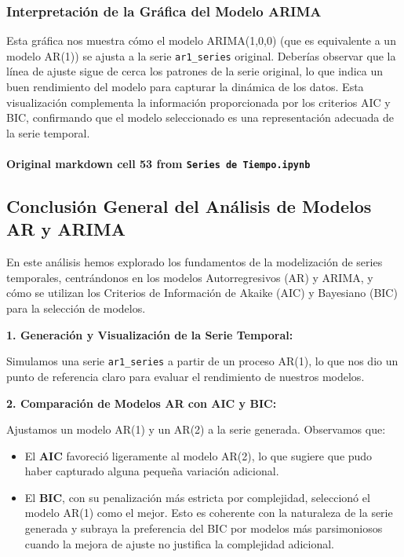 \documentclass[
  11pt,
]{article}
\providecommand{\tightlist}{%
  \setlength{\itemsep}{0pt}\setlength{\parskip}{0pt}}
\begin{document}
\subsubsection{Interpretación de la Gráfica del Modelo ARIMA}\label{interpretaciuxf3n-de-la-gruxe1fica-del-modelo-arima}

Esta gráfica nos muestra cómo el modelo ARIMA(1,0,0) (que es equivalente a un modelo AR(1)) se ajusta a la serie \texttt{ar1\_series} original. Deberías observar que la línea de ajuste sigue de cerca los patrones de la serie original, lo que indica un buen rendimiento del modelo para capturar la dinámica de los datos. Esta visualización complementa la información proporcionada por los criterios AIC y BIC, confirmando que el modelo seleccionado es una representación adecuada de la serie temporal.

\paragraph{\texorpdfstring{Original markdown cell 53 from \texttt{Series\ de\ Tiempo.ipynb}}{Original markdown cell 53 from Series de Tiempo.ipynb}}\label{original-markdown-cell-53-from-series-de-tiempoipynb}

\subsection{Conclusión General del Análisis de Modelos AR y ARIMA}\label{conclusiuxf3n-general-del-anuxe1lisis-de-modelos-ar-y-arima}

En este análisis hemos explorado los fundamentos de la modelización de series temporales, centrándonos en los modelos Autorregresivos (AR) y ARIMA, y cómo se utilizan los Criterios de Información de Akaike (AIC) y Bayesiano (BIC) para la selección de modelos.

\textbf{1. Generación y Visualización de la Serie Temporal:}

Simulamos una serie \texttt{ar1\_series} a partir de un proceso AR(1), lo que nos dio un punto de referencia claro para evaluar el rendimiento de nuestros modelos.

\textbf{2. Comparación de Modelos AR con AIC y BIC:}

Ajustamos un modelo AR(1) y un AR(2) a la serie generada. Observamos que:

\begin{itemize}
\tightlist
\item
  El \textbf{AIC} favoreció ligeramente al modelo AR(2), lo que sugiere que pudo haber capturado alguna pequeña variación adicional.
\item
  El \textbf{BIC}, con su penalización más estricta por complejidad, seleccionó el modelo AR(1) como el mejor. Esto es coherente con la naturaleza de la serie generada y subraya la preferencia del BIC por modelos más parsimoniosos cuando la mejora de ajuste no justifica la complejidad adicional.
\end{itemize}
\end{document}
